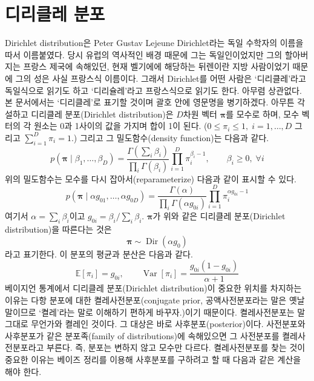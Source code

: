 \documentclass[a4paper, 10pt]{book}
\newcommand{\bs}{\boldsymbol}
\newcommand{\opn}{\operatorname}
\begin{document}
\section{디리클레 분포}
Dirichlet distribution은 Peter Gustav Lejeune Dirichlet라는 독일 수학자의 이름을 따서 이름붙였다. 당시 유럽의 역사적인 배경 때문에 그는 독일인이었지만 그의 할아버지는 프랑스 제국에 속해있던, 현재 벨기에에 해당하는 뒤렌이란 지방 사람이었기 때문에 그의 성은 사실 프랑스식 이름이다. 그래서 Dirichlet를 어떤 사람은 `디리클레'라고 독일식으로 읽기도 하고 `디리슐레'라고 프랑스식으로 읽기도 한다. 아무렴 상관없다. 본 문서에서는 `디리클레'로 표기할 것이며 괄호 안에 영문명을 병기하겠다. 아무튼 각설하고 디리클레 분포(Dirichlet distribution)은 $D$차원 벡터 $\bs{\pi}$를 모수로 하며, 모수 벡터의 각 원소는 0과 1사이의 값을 가지며 합이 1이 된다. ($0\leq \pi_{i} \leq 1,\; i=1,\ldots , D$ 그리고 $\sum_{i=1}^{D}\pi_{i}=1$.) 그리고 그 밀도함수(density function)는 다음과 같다.
\begin{equation}
  p\left(\bs{\pi}\;|\;\beta_{1},\ldots , \beta_{D}\right) = \frac{\Gamma\left(\sum_{i}\beta_{i}\right)}{\prod_{i}\Gamma\left(\beta_{i}\right)}\prod_{i=1}^{D}\pi_{i}^{\beta_{i}-1},\qquad \beta_{i}\geq 0, \; \forall i
\end{equation}
위의 밀도함수는 모수를 다시 잡아서(reparameterize) 다음과 같이 표시할 수 있다.
\begin{equation}
  p\left(\bs{\pi}\;|\;\alpha g_{01}, \ldots , \alpha g_{0D}\right) =\frac{\Gamma\left(\alpha\right)}{\prod_{i}\Gamma\left(\alpha g_{0i}\right)}\prod_{i=1}^{D}\pi_{i}^{\alpha g_{0i}-1}
\end{equation}
여기서 $\alpha = \sum_{i}\beta_{i}$이고 $g_{0i}=\beta_{i}/\sum_{i}\beta_{i}$. $\bs{\pi}$가 위와 같은 디리클레 분포(Dirichlet distribution)을 따른다는 것은 
\begin{equation}
  \bs{\pi}\sim\opn{Dir}\left(\alpha g_{0}\right)
\end{equation}
라고 표기한다. 이 분포의 평균과 분산은 다음과 같다.
\begin{equation}
  \mathbb{E}\left[\pi_{i}\right] =g_{0i}, \qquad \opn{Var}\left[\pi_{i}\right] = \frac{g_{0i}\left(1-g_{0i}\right)}{\alpha+1}
\end{equation}
베이지언 통계에서 디리클레 분포(Dirichlet distribution)이 중요한 위치를 차지하는 이유는 다항 분포에 대한 켤레사전분포(conjugate prior, 공액사전분포라는 말은 옛날 말이므로 `켤레'라는 말로 이해하기 편하게 바꾸자.)이기 때문이다. 켤레사전분포는 말 그대로 무언가와 켤레인 것이다. 그 대상은 바로 사후분포(posterior)이다. 사전분포와 사후분포가 같은 분포족(family of distributions)에 속해있으면 그 사전분포를 켤레사전분포라고 부른다. 즉, 분포는 변하지 않고 모수만 다르다. 켤레사전분포를 찾는 것이 중요한 이유는 베이즈 정리를 이용해 사후분포를 구하려고 할 때 다음과 같은 계산을 해야 한다.
\end{document}
